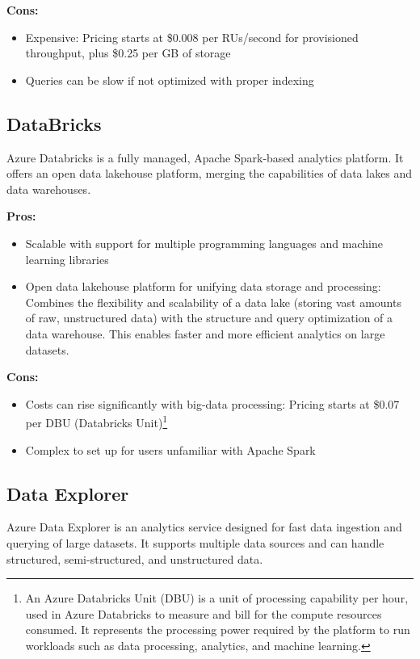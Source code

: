 \textbf{Cons:}
\begin{itemize}
    \item Expensive: Pricing starts at \$0.008 per RUs/second for provisioned throughput, plus \$0.25 per GB of storage
    \item Queries can be slow if not optimized with proper indexing
\end{itemize}

\subsection*{DataBricks}
\label{azure:databricks}
Azure Databricks is a fully managed, Apache Spark-based analytics platform. It offers an open data lakehouse platform, merging the capabilities of data lakes and data warehouses.

\textbf{Pros:}
\begin{itemize}
    \item Scalable with support for multiple programming languages and machine learning libraries
    \item Open data lakehouse platform for unifying data storage and processing: Combines the flexibility and scalability of a data lake (storing vast amounts of raw, unstructured data) with the structure and query optimization of a data warehouse. This enables faster and more efficient analytics on large datasets.
\end{itemize}

\textbf{Cons:}
\begin{itemize}
    \item Costs can rise significantly with big-data processing: Pricing starts at \$0.07 per DBU (Databricks Unit)\footnote{An Azure Databricks Unit (DBU) is a unit of processing capability per hour, used in Azure Databricks to measure and bill for the compute resources consumed. It represents the processing power required by the platform to run workloads such as data processing, analytics, and machine learning.}
    \item Complex to set up for users unfamiliar with Apache Spark
\end{itemize}

\subsection*{Data Explorer}
\label{azure:data-explorer}
Azure Data Explorer is an analytics service designed for fast data ingestion and querying of large datasets. It supports multiple data sources and can handle structured, semi-structured, and unstructured data.

